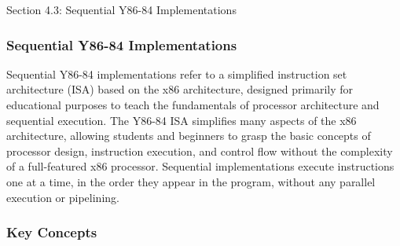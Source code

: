 \begin{notes}{Section 4.3: Sequential Y86-84 Implementations}
    \subsubsection*{Sequential Y86-84 Implementations}

    Sequential Y86-84 implementations refer to a simplified instruction set architecture (ISA) based on the x86 architecture, designed primarily for educational purposes to teach the fundamentals of 
    processor architecture and sequential execution. The Y86-84 ISA simplifies many aspects of the x86 architecture, allowing students and beginners to grasp the basic concepts of processor design, 
    instruction execution, and control flow without the complexity of a full-featured x86 processor. Sequential implementations execute instructions one at a time, in the order they appear in the 
    program, without any parallel execution or pipelining. \vspace*{1em}
    
    \subsubsection*{Key Concepts}
    

\end{notes}
